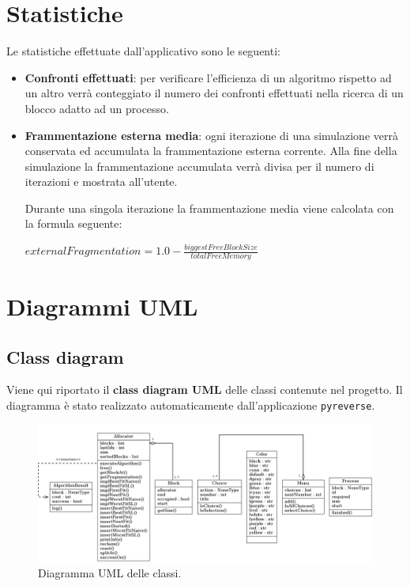 \documentclass[12pt]{report}
\renewcommand\emph{\textbf}
\begin{document}
    \section{Statistiche}
        Le statistiche effettuate dall'applicativo sono le seguenti:

        \begin{itemize}
            \item \emph{Confronti effettuati}: per verificare l'efficienza di un algoritmo rispetto ad un altro verrà conteggiato il numero dei confronti effettuati nella ricerca di un blocco adatto ad un processo.
            \item \emph{Frammentazione esterna media}: ogni iterazione di una simulazione verrà conservata ed accumulata la frammentazione esterna corrente. Alla fine della simulazione la frammentazione accumulata verrà divisa per il numero di iterazioni e mostrata all'utente.

            Durante una singola iterazione la frammentazione media viene calcolata con la formula seguente:

            $ externalFragmentation = 1.0 - \frac{biggestFreeBlockSize}{totalFreeMemory} $

        \end{itemize}

    \section{Diagrammi UML}

        \subsection{Class diagram}

            Viene qui riportato il \emph{class diagram UML} delle classi contenute nel progetto.
            Il diagramma è stato realizzato automaticamente dall'applicazione \texttt{pyreverse}.

            \begin{figure}[H]
                \caption{Diagramma UML delle classi.}
                \centering
                \includegraphics[width=1\textwidth]{diatemp}
            \end{figure}
\end{document}
